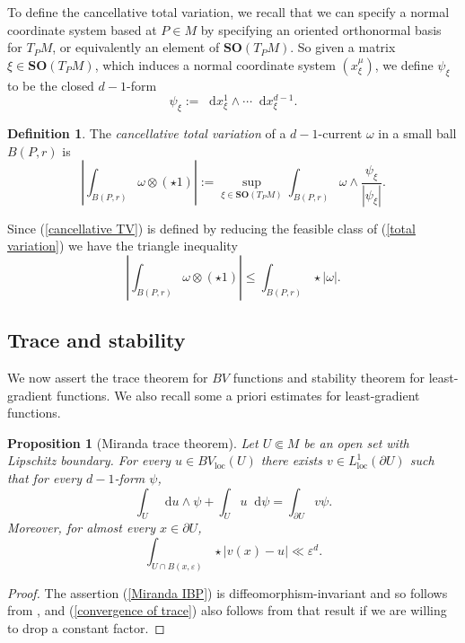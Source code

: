 \documentclass[reqno,12pt,letterpaper]{amsart}
\newcommand{\SpOrth}{\mathbf{SO}}
\newcommand*\dif{\mathop{}\!\mathrm{d}}
\newcommand{\dfn}[1]{\emph{#1}\index{#1}}
\newcommand{\loc}{\mathrm{loc}}
\newtheorem{proposition}[theorem]{Proposition}
\theoremstyle{definition}
\newtheorem{definition}[theorem]{Definition}
\numberwithin{equation}{section}
\begin{document}
To define the cancellative total variation, we recall that we can specify a normal coordinate system based at $P \in M$ by specifying an oriented orthonormal basis for $T_PM$, or equivalently an element of $\SpOrth(T_PM)$.
So given a matrix $\xi \in \SpOrth(T_PM)$, which induces a normal coordinate system $(x^\mu_\xi)$, we define $\psi_\xi$ to be the closed $d-1$-form
$$\psi_\xi := \dif x^1_\xi \wedge \cdots \dif x^{d - 1}_\xi.$$

\begin{definition}
The \dfn{cancellative total variation} of a $d-1$-current $\omega$ in a small ball $B(P, r)$ is
\begin{equation}\label{cancellative TV}
\left|\int_{B(P, r)} \omega \otimes (\star 1)\right| := \sup_{\xi \in \SpOrth(T_PM)} \int_{B(P, r)} \omega \wedge \frac{\psi_\xi}{|\psi_\xi|}.
\end{equation}
\end{definition}

Since (\ref{cancellative TV}) is defined by reducing the feasible class of (\ref{total variation}) we have the triangle inequality
\begin{equation}\label{triangle TV}
\left|\int_{B(P, r)} \omega \otimes (\star 1)\right| \leq \int_{B(P, r)} \star |\omega|.
\end{equation}


\subsection{Trace and stability}
We now assert the trace theorem for $BV$ functions and stability theorem for least-gradient functions.
We also recall some a priori estimates for least-gradient functions.

\begin{proposition}[Miranda trace theorem]\label{traces}
Let $U \Subset M$ be an open set with Lipschitz boundary.
For every $u \in BV_\loc(U)$ there exists $v \in L^1_\loc(\partial U)$ such that for every $d-1$-form $\psi$,
\begin{equation}\label{Miranda IBP}
\int_U \dif u \wedge \psi + \int_U u \dif \psi = \int_{\partial U} v\psi.
\end{equation}
Moreover, for almost every $x \in \partial U$,
\begin{equation}\label{convergence of trace}
\int_{U \cap B(x, \varepsilon)} \star |v(x) - u| \ll \varepsilon^d.
\end{equation}
\end{proposition}
\begin{proof}
The assertion (\ref{Miranda IBP}) is diffeomorphism-invariant and so follows from \cite[Teorema 1]{Miranda67}, and (\ref{convergence of trace}) also follows from that result if we are willing to drop a constant factor.
\end{proof}
\end{document}
